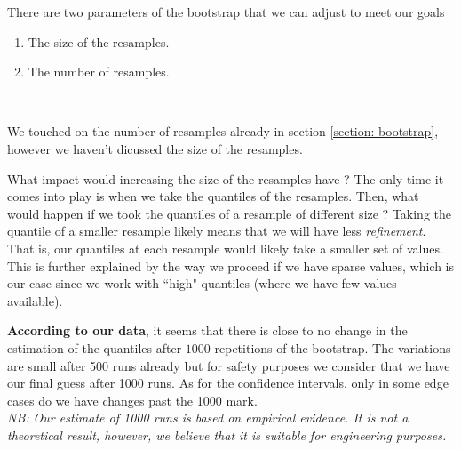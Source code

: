 \documentclass{article}
\begin{document}
There are two parameters of the bootstrap that we can adjust to meet our goals
\begin{enumerate}
    \item The size of the resamples.
    \item The number of resamples.
\end{enumerate}\

We touched on the number of resamples already in section \ref{section: bootstrap}, however we haven't dicussed the size of the resamples.

What impact would increasing the size of the resamples have ? The only time it comes into play is when we take the quantiles of the resamples. Then, what would happen if we took the quantiles of a resample of different size ? Taking the quantile of a smaller resample likely means that we will have less \textit{refinement}. That is, our quantiles at each resample would likely take a smaller set of values. This is further explained by the way we proceed if we have sparse values, which is our case since we work with ``high" quantiles (where we have few values available).

\textbf{According to our data}, it seems that there is close to no change in the estimation of the quantiles after $1000$ repetitions of the bootstrap. The variations are small after 500 runs already but for safety purposes we consider that we have our final guess after 1000 runs. As for the confidence intervals, only in some edge cases do we have changes past the 1000 mark. \\
\textit{NB: Our estimate of 1000 runs is based on empirical evidence. It is not a theoretical result, however, we believe that it is suitable for engineering purposes.}

\end{document}
